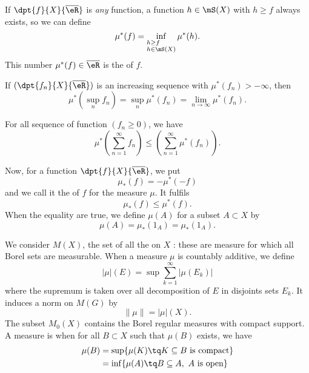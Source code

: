 If $\dpt{f}{X}{\overline{ \eR }}$ is \emph{any} function, a function $h\in\mS(X)$ with $h\geq f$ always exists, so we can define
\begin{equation}
  \mu^*(f)=\inf_{%
\begin{subarray}{l}
h\geq f\\
h\in\mS(X)
\end{subarray}
} \mu^*(h).
\end{equation}
This number $\mu^*(f)\in\overline{ \eR }$ is the  of $f$.


\begin{proposition}
If $(\dpt{f_n}{X}{\overline{ \eR }})$ is an increasing sequence with $\mu^*(f_n)>-\infty$, then
\[ 
  \mu^*(\sup_nf_n)=\sup_n\mu^*(f_n)=\lim_{n\to\infty}\mu^*(f_n).
\]

\end{proposition}

\begin{proposition}
For all sequence of function $(f_n\geq 0)$, we have
\[ 
  \mu^*\left( \sum_{n=1}^{\infty}f_n\right)\leq\left(\sum_{n=1}^{\infty}\mu^*(f_n) \right).
\]

\end{proposition}

Now, for a function $\dpt{f}{X}{\overline{ \eR }}$, we put
\begin{equation}
  \mu_*(f)=-\mu^*(-f)
\end{equation}
and we call it the  of $f$ for the measure $\mu$. It fulfils
\[ 
  \mu_*(f)\leq\mu^*(f).
\]
When the equality are true, we define $\mu(A)$ for a subset $A\subset X$ by
\begin{equation}
   \mu(A)=\mu_*(1_A)=\mu_*(1_A).
\end{equation}

We consider $M(X)$\label{defMX}, the set of all the  on $X$ : these are measure for which all Borel sets are measurable. When a measure $\mu$ is countably additive, we define
\begin{equation}
   | \mu |(E)=\sup \sum_{k=1}^{\infty}| \mu(E_k) |
\end{equation}
where the supremum is taken over all decomposition of $E$ in disjoints sets $E_k$. It induces a norm on $M(G)$ by
\[ 
  \| \mu \|=| \mu |(X).
\]
The subset  $M_0(X)$\label{defMzX} contains the Borel regular measures with compact support. A measure is  when for all $B\subset X$ such that $\mu(B)$ exists, we have
\begin{equation}
\begin{split}
    \mu(B)&=\sup\{ \mu(K)\tq K\subseteq B \textrm{ is compact} \}\\
		&=\inf\{ \mu(A)\tq B\subseteq A, \textrm{ $A$ is open} \}
\end{split}
\end{equation}

